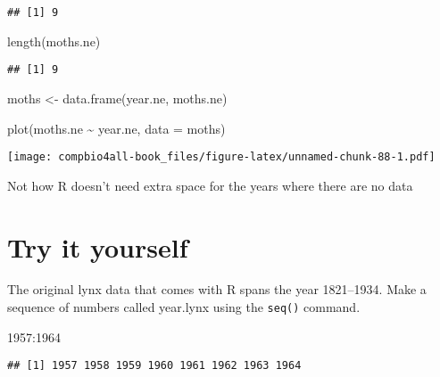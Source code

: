 \documentclass[
]{book}
\newenvironment{Shaded}{\begin{snugshade}}{\end{snugshade}}
\newcommand{\AttributeTok}[1]{\textcolor[rgb]{0.77,0.63,0.00}{#1}}
\newcommand{\DecValTok}[1]{\textcolor[rgb]{0.00,0.00,0.81}{#1}}
\newcommand{\FunctionTok}[1]{\textcolor[rgb]{0.00,0.00,0.00}{#1}}
\newcommand{\NormalTok}[1]{#1}
\newcommand{\OtherTok}[1]{\textcolor[rgb]{0.56,0.35,0.01}{#1}}
\newcommand{\SpecialCharTok}[1]{\textcolor[rgb]{0.00,0.00,0.00}{#1}}
\begin{document}
\begin{verbatim}
## [1] 9
\end{verbatim}

\begin{Shaded}
\begin{Highlighting}[]
\FunctionTok{length}\NormalTok{(moths.ne)}
\end{Highlighting}
\end{Shaded}

\begin{verbatim}
## [1] 9
\end{verbatim}

\begin{Shaded}
\begin{Highlighting}[]
\NormalTok{moths }\OtherTok{\textless{}{-}} \FunctionTok{data.frame}\NormalTok{(year.ne,}
\NormalTok{                    moths.ne)}
\end{Highlighting}
\end{Shaded}

\begin{Shaded}
\begin{Highlighting}[]
\FunctionTok{plot}\NormalTok{(moths.ne }\SpecialCharTok{\textasciitilde{}}\NormalTok{ year.ne, }\AttributeTok{data =}\NormalTok{ moths)}
\end{Highlighting}
\end{Shaded}

\texttt{[image: compbio4all-book\_files/figure-latex/unnamed-chunk-88-1.pdf]}

Not how R doesn't need extra space for the years where there are no data

\hypertarget{try-it-yourself}{%
\section{Try it yourself}\label{try-it-yourself}}

The original lynx data that comes with R spans the year 1821--1934. Make a sequence of numbers called year.lynx using the \texttt{seq()} command.

\begin{Shaded}
\begin{Highlighting}[]
\DecValTok{1957}\SpecialCharTok{:}\DecValTok{1964}
\end{Highlighting}
\end{Shaded}

\begin{verbatim}
## [1] 1957 1958 1959 1960 1961 1962 1963 1964
\end{verbatim}
\end{document}
